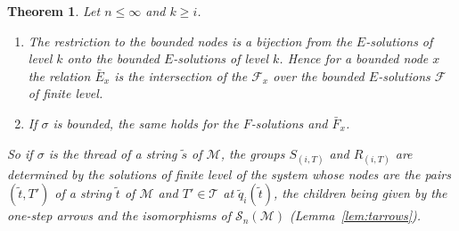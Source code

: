 \documentclass[11pt]{amsart}
\newtheorem{thm}{Theorem}[section]
\theoremstyle{definition}
\newcommand{\cM}{\mathcal M}
\newcommand{\cS}{\mathcal S}
\begin{document}
\begin{thm}\label{thm:bnodes}
Let $n\le\infty$ and $k\ge i$.
\begin{enumerate}
\item[(a)] The restriction to the bounded nodes is a bijection from
the $E$-solutions of level $k$ onto the bounded $E$-solutions of
level $k$. Hence for a bounded node $x$ the relation $\bar E_x$ is
the intersection of the $\mathcal F_x$ over the bounded $E$-solutions
$\mathcal F$ of finite level.
\item[(b)] If $\sigma$ is bounded, the same holds for the
$F$-solutions and $\bar F_x$.
\end{enumerate}
So if $\sigma$ is the thread of a string $\tilde s$ of $\cM$, the
groups $S_{(i,T)}$ and $R_{(i,T)}$ are determined by the solutions of
finite level of the system whose nodes are the pairs $(\tilde t,T')$
of a string $\tilde t$ of $\cM$ and $T'\in\mathcal T$ at $\tilde q_i(\tilde
t)$, the children being given by the one-step arrows and the
isomorphisms of $\cS_n(\cM)$ \textup{(Lemma~\ref{lem:tarrows})}.
\end{thm}
\end{document}
